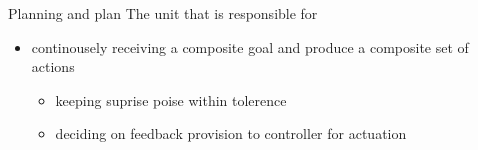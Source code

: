 \begin{frame}{Planning and plan}
    The unit that is responsible for
    \begin{itemize}
        \item continousely receiving a composite goal and produce a composite set of actions
        \begin{itemize}
            \item keeping suprise poise within tolerence
            \item deciding on feedback provision to controller for actuation
        \end{itemize}
    \end{itemize}
\end{frame}